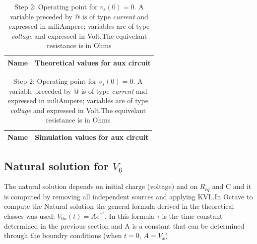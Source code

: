 \begin{table}[H]
\parbox{.45\linewidth}{
  \centering
  \begin{tabular}{|l|r|}
    \hline    
    {\bf Name} & {\bf Theoretical values for aux circuit}\\ \hline
    
  \end{tabular}
  \caption{A variable that stars with a "V" is of type {\it voltage} and expressed in
    Volt (V).The variable $R_{eq}$ is expresses in Ohm and the variable $\tau$ is expressed in seconds }
  \label{tab:equivalent resistor}

}

 \hfill
 \parbox{.45\linewidth}{
  \centering
  \begin{tabular}{|l|r|}
    \hline    
    {\bf Name} & {\bf Simulation values for aux circuit } \\ \hline
    
  \end{tabular}
  \caption{Step 2: Operating point for {\it $v_s(0)=0$}. A variable preceded by @ is of type {\em current}
    and expressed in miliAmpere; variables are of type {\it voltage} and expressed in
    Volt.The equivelant resistance is in Ohms}
  \label{tab:opeq}
  }
\end{table}



\pagebreak
\subsection{Natural solution for $V_6$}

The natural solution depends on initial charge (voltage) and on $R_{eq}$ and C and it is computed by removing all independent sources and applying KVL.In Octave to compute the Natural solution the general formula derived in the theoretical classes was used: $V_{6n}(t)=Ae^{\frac{-t}{\tau}}$. In this formula $\tau$ is the time constant determined in the previous section and  A is a constant that can be determined through the boundry conditions (when $t=0$, $A=V_x$)

